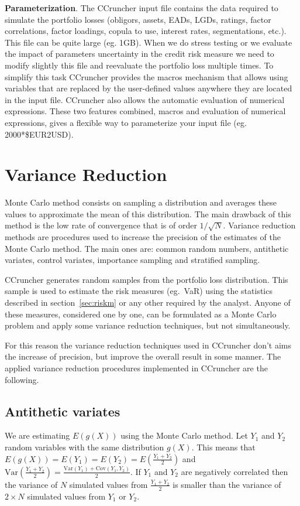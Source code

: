 \documentclass[11pt,fleqn]{book} %
\begin{document}
\textbf{Parameterization}. 
The CCruncher input file contains the data required to simulate the portfolio
losses (obligors, assets, EADs, LGDs, ratings, factor correlations, factor
loadings, copula to use, interest rates, segmentations, etc.). This file can 
be quite large (eg. 1GB). 
When we do stress testing or we evaluate the impact of parameters
uncertainty in the credit risk measure we need to modify slightly this file 
and reevaluate the portfolio loss multiple times. To simplify this task 
CCruncher provides the macros mechanism that allows using variables that are 
replaced by the user-defined values anywhere they are located in the 
input file. CCruncher also allows the automatic evaluation of numerical 
expressions. These two features combined, macros and evaluation of numerical 
expressions, gives a flexible way to parameterize your input file 
(eg. 2000*\$EUR2USD). 

\section{Variance Reduction}

Monte Carlo method consists on sampling a distribution and averages these
values to approximate the mean of this distribution. The main drawback 
of this method is the low rate of convergence that is of order $1/\sqrt{N}$.
Variance reduction methods are procedures used to increase the precision 
of the estimates of the Monte Carlo method. The main ones are: common random 
numbers, antithetic variates, control variates, importance sampling and 
stratified sampling.

CCruncher generates random samples from the portfolio loss distribution.
This sample is used to estimate the risk measures (eg.\ VaR) using the 
statistics described in section~\ref{sec:riskm} or any other required 
by the analyst. Anyone of these measures, considered one by one, can be 
formulated as a Monte Carlo problem and apply some variance 
reduction techniques, but not simultaneously. 

For this reason the variance reduction techniques used in CCruncher 
don't aims the increase of precision, but improve the overall result in 
some manner. The applied variance reduction procedures implemented in
CCruncher are the following.

\subsection{Antithetic variates}
We are estimating $E(g(X))$ using the Monte 
Carlo method. Let $Y_1$ and $Y_2$ random variables with the same distribution
$g(X)$. This means that $E(g(X)) = E(Y_1) = E(Y_2) = E(\frac{Y_1+Y_2}{2})$ and
$\text{Var}\left(\frac{Y_1+Y_2}{2}\right) = 
\frac{\text{Var}(Y_1)+\text{Cov}(Y_1,Y_2)}{2}$.
If $Y_1$ and $Y_2$ are negatively correlated then the variance of $N$ 
simulated values from $\frac{Y_1+Y_2}{2}$ is smaller than the variance 
of $2{\times}N$ simulated values from $Y_1$ or $Y_2$.
\end{document}
